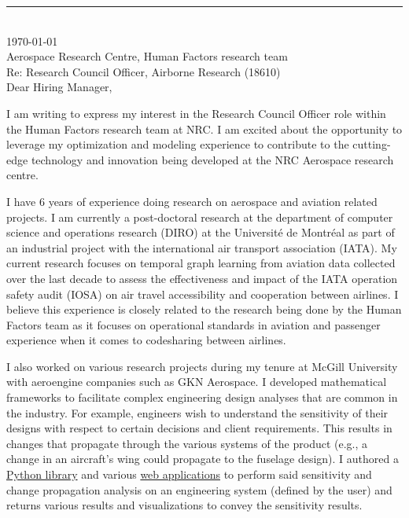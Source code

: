 \documentclass[12pt]{article} %
\begin{document}
\medskip %
\rule[0pt]{\textwidth}{1pt}\\
\today\\[6pt]
Aerospace Research Centre, Human Factors research team\\
Re: Research Council Officer, Airborne Research (18610)\\[6pt]


Dear Hiring Manager,

\medskip %

I am writing to express my interest in the Research Council Officer role within the Human Factors research team at NRC. I am excited about the opportunity to leverage my optimization and modeling experience to contribute to the cutting-edge technology and innovation being developed at the NRC Aerospace research centre.

\medskip %

I have 6 years of experience doing research on aerospace and aviation related projects. I am currently a post-doctoral research at the department of computer science and operations research (DIRO) at the Universit\'{e} de Montr\'{e}al as part of an industrial project with the international air transport association (IATA). My current research focuses on temporal graph learning from aviation data collected over the last decade to assess the effectiveness and impact of the IATA operation safety audit (IOSA) on air travel accessibility and cooperation between airlines. I believe this experience is closely related to the research being done by the Human Factors team as it focuses on operational standards in aviation and passenger experience when it comes to codesharing between airlines.

\medskip %

I also worked on various research projects during my tenure at McGill University with aeroengine companies such as GKN Aerospace. I developed mathematical frameworks to facilitate complex engineering design analyses that are common in the industry. For example, engineers wish to understand the sensitivity of their designs with respect to certain decisions and client requirements. This results in changes that propagate through the various systems of the product (e.g., a change in an aircraft's wing could propagate to the fuselage design). I authored a \href{https://sed-group.github.io/mvmlib/index.html}{Python library} and various \href{https://github.com/khbalhandawi/scale_AM_webapp}{web applications} to perform said sensitivity and change propagation analysis on an engineering system (defined by the user) and returns various results and visualizations to convey the sensitivity results.
\end{document}
